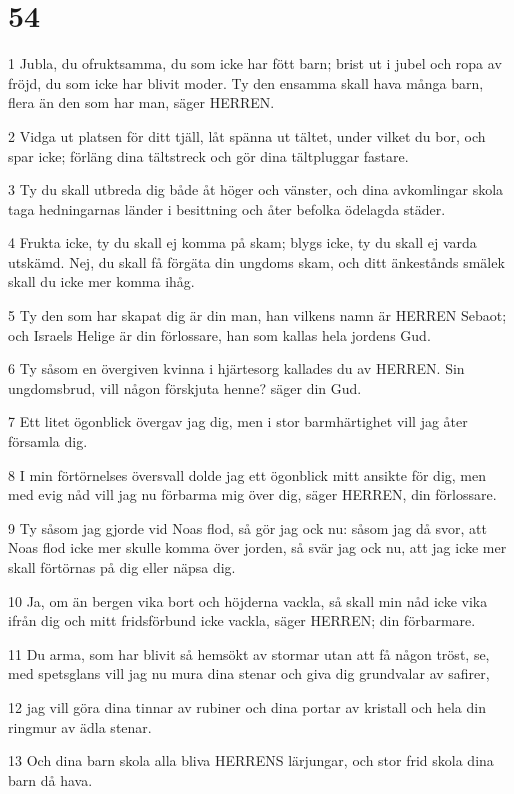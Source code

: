 \chapter{54}

\par 1 Jubla, du ofruktsamma, du som icke har fött barn; brist ut i jubel och ropa av fröjd, du som icke har blivit moder. Ty den ensamma skall hava många barn, flera än den som har man, säger HERREN.
\par 2 Vidga ut platsen för ditt tjäll, låt spänna ut tältet, under vilket du bor, och spar icke; förläng dina tältstreck och gör dina tältpluggar fastare.
\par 3 Ty du skall utbreda dig både åt höger och vänster, och dina avkomlingar skola taga hedningarnas länder i besittning och åter befolka ödelagda städer.
\par 4 Frukta icke, ty du skall ej komma på skam; blygs icke, ty du skall ej varda utskämd. Nej, du skall få förgäta din ungdoms skam, och ditt änkestånds smälek skall du icke mer komma ihåg.
\par 5 Ty den som har skapat dig är din man, han vilkens namn är HERREN Sebaot; och Israels Helige är din förlossare, han som kallas hela jordens Gud.
\par 6 Ty såsom en övergiven kvinna i hjärtesorg kallades du av HERREN. Sin ungdomsbrud, vill någon förskjuta henne? säger din Gud.
\par 7 Ett litet ögonblick övergav jag dig, men i stor barmhärtighet vill jag åter församla dig.
\par 8 I min förtörnelses översvall dolde jag ett ögonblick mitt ansikte för dig, men med evig nåd vill jag nu förbarma mig över dig, säger HERREN, din förlossare.
\par 9 Ty såsom jag gjorde vid Noas flod, så gör jag ock nu: såsom jag då svor, att Noas flod icke mer skulle komma över jorden, så svär jag ock nu, att jag icke mer skall förtörnas på dig eller näpsa dig.
\par 10 Ja, om än bergen vika bort och höjderna vackla, så skall min nåd icke vika ifrån dig och mitt fridsförbund icke vackla, säger HERREN; din förbarmare.
\par 11 Du arma, som har blivit så hemsökt av stormar utan att få någon tröst, se, med spetsglans vill jag nu mura dina stenar och giva dig grundvalar av safirer,
\par 12 jag vill göra dina tinnar av rubiner och dina portar av kristall och hela din ringmur av ädla stenar.
\par 13 Och dina barn skola alla bliva HERRENS lärjungar, och stor frid skola dina barn då hava.
